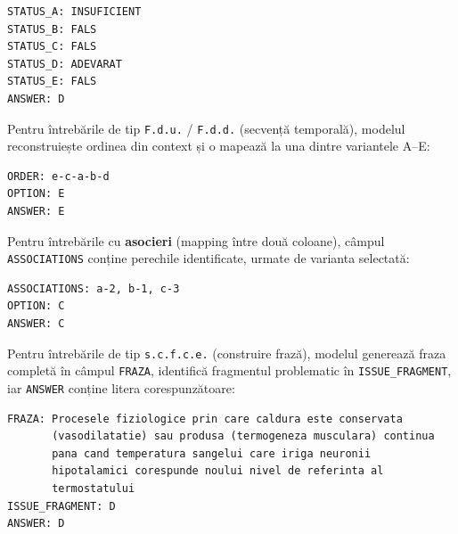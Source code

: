 \documentclass[12pt, a4paper, oneside, romanian]{teza-upb}
\begin{document}
\begin{center}
\begin{minipage}{0.34\textwidth}
\begin{lstlisting}[numbers=none]
STATUS_A: INSUFICIENT
STATUS_B: FALS
STATUS_C: FALS
STATUS_D: ADEVARAT
STATUS_E: FALS
ANSWER: D
\end{lstlisting}
\end{minipage}
\end{center}

Pentru întrebările de tip \texttt{F.d.u.} / \texttt{F.d.d.} (secvență temporală), modelul reconstruiește ordinea din context și o mapează la una dintre variantele A--E:

\begin{center}
\begin{minipage}{0.30\textwidth}
\begin{lstlisting}[numbers=none]
ORDER: e-c-a-b-d
OPTION: E
ANSWER: E
\end{lstlisting}
\end{minipage}
\end{center}

Pentru întrebările cu \textbf{asocieri} (mapping între două coloane), câmpul \texttt{ASSOCIATIONS} conține perechile identificate, urmate de varianta selectată:

\begin{center}
\begin{minipage}{0.42\textwidth}
\begin{lstlisting}[numbers=none]
ASSOCIATIONS: a-2, b-1, c-3
OPTION: C
ANSWER: C
\end{lstlisting}
\end{minipage}
\end{center}

Pentru întrebările de tip \texttt{s.c.f.c.e.} (construire frază), modelul generează fraza completă în câmpul \texttt{FRAZA}, identifică fragmentul problematic în \texttt{ISSUE\_FRAGMENT}, iar \texttt{ANSWER} conține litera corespunzătoare:

\begin{center}
\begin{minipage}{0.78\textwidth}
\begin{lstlisting}[numbers=none]
FRAZA: Procesele fiziologice prin care caldura este conservata
       (vasodilatatie) sau produsa (termogeneza musculara) continua
       pana cand temperatura sangelui care iriga neuronii
       hipotalamici corespunde noului nivel de referinta al
       termostatului
ISSUE_FRAGMENT: D
ANSWER: D
\end{lstlisting}
\end{minipage}
\end{center}
\end{document}
